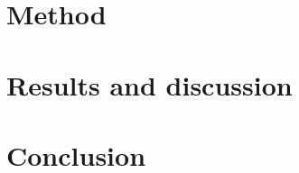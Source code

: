 \documentclass[12pt]{article}
\begin{document}
\begin{flushleft}
\newpage
\section*{Method}

\section*{Results and discussion}

\section*{Conclusion}


\end{flushleft}
\end{document}
